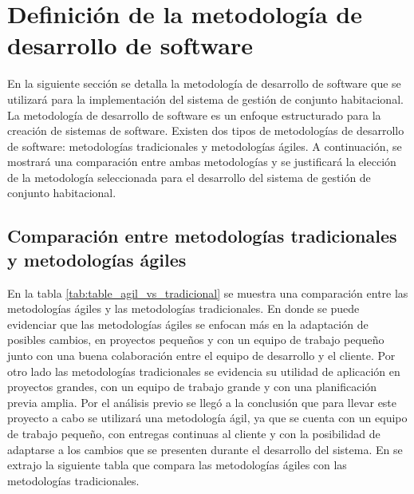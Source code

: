 \section{Definición de la metodología de desarrollo de software}\label{sec:definicion-metodologia}

En la siguiente sección se detalla la metodología de desarrollo de software que se utilizará para la implementación del sistema de gestión de conjunto habitacional.
La metodología de desarrollo de software es un enfoque estructurado para la creación de sistemas de software.
Existen dos tipos de metodologías de desarrollo de software: metodologías tradicionales y metodologías ágiles.
A continuación, se mostrará una comparación entre ambas metodologías y se justificará la elección de la metodología seleccionada para el desarrollo del sistema de gestión de conjunto habitacional.

\subsection{Comparación entre metodologías tradicionales y metodologías ágiles}\label{subsec:comparacion-entre-metodologias-tradicionales-y-metodologias-agiles}

En la tabla \ref{tab:table_agil_vs_tradicional} se muestra una comparación entre las metodologías ágiles y las metodologías tradicionales.
En donde se puede evidenciar que las metodologías ágiles se enfocan más en la adaptación de posibles cambios, en proyectos pequeños y con un equipo de trabajo pequeño junto con una buena colaboración entre el equipo de desarrollo y el cliente.
Por otro lado las metodologías tradicionales se evidencia su utilidad de aplicación en proyectos grandes, con un equipo de trabajo grande y con una planificación previa amplia.
Por el análisis previo se llegó a la conclusión que para llevar este proyecto a cabo se utilizará una metodología ágil, ya que se cuenta con un equipo de trabajo pequeño, con entregas continuas al cliente y con la posibilidad de adaptarse a los cambios que se presenten durante el desarrollo del sistema.
En \cite{islam_comparison_2020} se extrajo la siguiente tabla que compara las metodologías ágiles con las metodologías tradicionales.

